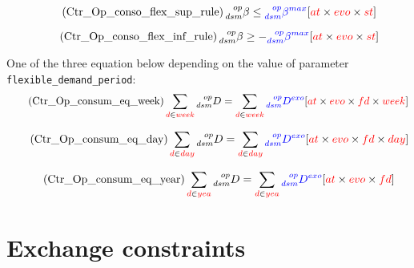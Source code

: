 \documentclass{article}
\begin{document}
\begin{equation} \tag{Ctr\_Op\_conso\_flex\_sup\_rule}
\prescript{op}{dsm}{\beta} \leq  \textcolor{blue}{\prescript{op}{dsm}{\beta^{max}}} \hfill [\textcolor{red}{at} \times \textcolor{red}{evo} \times \textcolor{red}{st}]
\label{eq:Ctr_Op_conso_flex_sup_rule}
\end{equation}

\begin{equation} \tag{Ctr\_Op\_conso\_flex\_inf\_rule}
\prescript{op}{dsm}{\beta} \geq - \textcolor{blue}{\prescript{op}{dsm}{\beta^{max}}} \hfill [\textcolor{red}{at} \times \textcolor{red}{evo} \times \textcolor{red}{st}]
\label{eq:Ctr_Op_conso_flex_inf_rule}
\end{equation}

One of the three equation below depending on the value of parameter  \verb|flexible_demand_period|: 
\begin{equation} \tag{Ctr\_Op\_consum\_eq\_week}
 \sum_{\textcolor{red}{d} \in \textcolor{red}{week}} \prescript{op}{dsm}{D} = \sum_{\textcolor{red}{d} \in \textcolor{red}{week}} \textcolor{blue}{\prescript{op}{dsm}{D^{exo}}}  \hfill [\textcolor{red}{at} \times \textcolor{red}{evo} \times \textcolor{red}{fd} \times \textcolor{red}{week}]
\label{eq:Ctr_Op_consum_eq_week}
\end{equation}

\begin{equation} \tag{Ctr\_Op\_consum\_eq\_day}
 \sum_{\textcolor{red}{d} \in \textcolor{red}{day}} \prescript{op}{dsm}{D} = \sum_{\textcolor{red}{d} \in \textcolor{red}{day}} \textcolor{blue}{\prescript{op}{dsm}{D^{exo}}}  \hfill [\textcolor{red}{at} \times \textcolor{red}{evo} \times \textcolor{red}{fd} \times \textcolor{red}{day}]
\label{eq:Ctr_Op_consum_eq_day}
\end{equation}

\begin{equation} \tag{Ctr\_Op\_consum\_eq\_year}
 \sum_{\textcolor{red}{d} \in \textcolor{red}{yea}} \prescript{op}{dsm}{D} = \sum_{\textcolor{red}{d} \in \textcolor{red}{yea}} \textcolor{blue}{\prescript{op}{dsm}{D^{exo}}}  \hfill [\textcolor{red}{at} \times \textcolor{red}{evo} \times \textcolor{red}{fd} ]
\label{eq:Ctr_Op_consum_eq_year}
\end{equation}

\newpage
\section{Exchange constraints}
\end{document}
